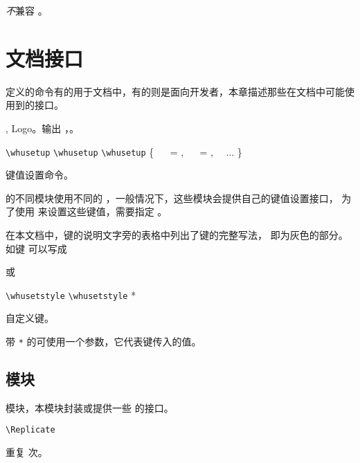 \documentclass{whudoc}
\begin{document}
\emph{不}兼容 。

\chapter{文档接口}

\WhuTeX 定义的命令有的用于文档中，有的则是面向开发者，本章描述那些在文档中可能使用到的接口。

\begin{function}{\WhuTeX,\WhuLaTeX}
Logo。输出 \WhuTeX，\WhuLaTeX。
\end{function}

\begin{function}{\whusetup}
\begin{syntax}
  \verb|\whusetup| 
  \verb|\whusetup|  
  \verb|\whusetup| \{
  ~~ =  ,
  ~~ =  ,
  ~~...
  \}
\end{syntax}
键值设置命令。

\WhuTeX 的不同模块使用不同的 ，一般情况下，这些模块会提供自己的键值设置接口，
为了使用  来设置这些键值，需要指定 。
\end{function}

在本文档中，键的说明文字旁的表格中列出了键的完整写法， 即为灰色的部分。
如键  可以写成 
\begin{xample}
或 
\stopxamplecode
\xamplecode\medskip
\end{xample}


\begin{function}{\whusetstyle}
\begin{syntax}
  \verb|\whusetstyle|     
  \verb|\whusetstyle| *   
\end{syntax}
自定义键。

带 \verb|*| 的可使用一个参数，它代表键传入的值。
\end{function}

\section{模块}

 模块，本模块封装或提供一些 \LaTeXe 的接口。

\begin{function}[EXP]{\Replicate}
\begin{syntax}
  \verb|\Replicate|  
\end{syntax}
重复   次。
\end{function}
\end{document}
